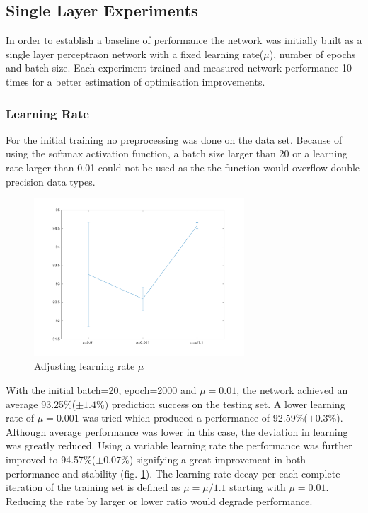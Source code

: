 \documentclass[11]{article}
\begin{document}
\subsection{Single Layer Experiments}
In order to establish a baseline of performance the network was initially built as a single layer perceptraon network with a fixed learning rate($\mu$), number of epochs and batch size. Each experiment trained and measured network performance 10 times for a better estimation of optimisation improvements. 

\subsubsection{Learning Rate}

For the initial training no preprocessing was done on the data set. Because of using the softmax activation function, a batch size larger than 20 or a learning rate larger than 0.01 could not be used as the the function would overflow double precision data types.

\begin{figure}[h]
\centering
\includegraphics[width=0.7\textwidth]{learning_rate.png}
\caption{Adjusting learning rate $\mu$}
\label{fig:learningrate}
\end{figure}

With the initial batch=20, epoch=2000 and $\mu=0.01$, the network achieved an average 93.25\%($\pm 1.4\%)$ prediction success on the testing set.  A lower learning rate of $\mu=0.001$ was tried which produced a performance of 92.59\%($\pm 0.3\%$). Although average performance was lower in this case, the deviation in learning was greatly reduced. Using a variable learning rate the performance was further improved to 94.57\%($\pm 0.07\%$) signifying a great improvement in both performance and stability (fig. \ref{fig:learningrate}). The learning rate decay per each complete iteration of the training set is defined as $\mu = \mu / 1.1$ starting with $\mu=0.01$. Reducing the rate by larger or lower ratio would degrade performance. 
\end{document}
